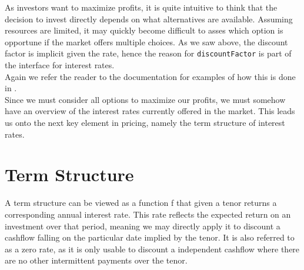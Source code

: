 As investors want to maximize profits, it is quite intuitive to think that
the decision to invest directly depends on what alternatives are available.
Assuming resources are limited, it may quickly become difficult to asses which
option is opportune if the market offers multiple choices. As we saw above,
the discount factor is implicit given the rate, hence the reason for
\texttt{discountFactor} is part of the interface for interest rates.\\
Again we refer the reader to the documentation\cite{hqldoc} for examples of
how this is done in \hql.\\

Since we must consider all options to maximize our profits, we must somehow have an
overview of the interest rates currently offered in the market. This leads us onto the
next key element in pricing, namely the term structure of interest rates.

\section{Term Structure}\label{sec:ts}

A term structure can be viewed as a function f that given a tenor returns 
a corresponding annual interest rate. This rate reflects the expected return 
on an investment over that period, meaning we may directly apply it to 
discount a cashflow falling on the particular date implied by the tenor.
It is also referred to as a zero rate, as it is only usable to discount 
a independent cashflow where there are no other intermittent payments over
the tenor.

